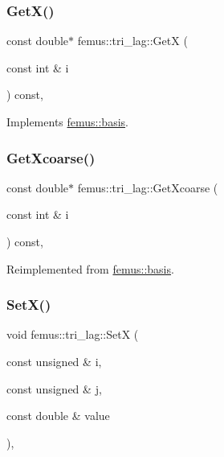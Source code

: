 \subsubsection{\texorpdfstring{Get\+X()}{GetX()}}
{\footnotesize\ttfamily const double$\ast$ femus\+::tri\+\_\+lag\+::\+GetX (\begin{DoxyParamCaption}\item[{const int \&}]{i }\end{DoxyParamCaption}) const\hspace{0.3cm}{\ttfamily [inline]}, {\ttfamily [virtual]}}



Implements \mbox{\hyperlink{classfemus_1_1basis_a00597122bbc75877f1c184f8fce4986c}{femus\+::basis}}.

\mbox{\label{classfemus_1_1tri__lag_a93b897c5080dee5a7415a85735f96330}} 
\subsubsection{\texorpdfstring{Get\+Xcoarse()}{GetXcoarse()}}
{\footnotesize\ttfamily const double$\ast$ femus\+::tri\+\_\+lag\+::\+Get\+Xcoarse (\begin{DoxyParamCaption}\item[{const int \&}]{i }\end{DoxyParamCaption}) const\hspace{0.3cm}{\ttfamily [inline]}, {\ttfamily [virtual]}}



Reimplemented from \mbox{\hyperlink{classfemus_1_1basis_afcabbbda61ede8f30158fe08ee0a5258}{femus\+::basis}}.

\mbox{\label{classfemus_1_1tri__lag_aa031dd1be0ccbd6ebdb8d57b3a28d374}} 
\subsubsection{\texorpdfstring{Set\+X()}{SetX()}}
{\footnotesize\ttfamily void femus\+::tri\+\_\+lag\+::\+SetX (\begin{DoxyParamCaption}\item[{const unsigned \&}]{i,  }\item[{const unsigned \&}]{j,  }\item[{const double \&}]{value }\end{DoxyParamCaption})\hspace{0.3cm}{\ttfamily [inline]}, {\ttfamily [virtual]}}



